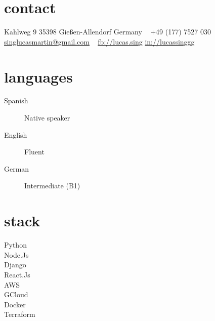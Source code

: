 \documentclass[a4paper,nocolors]{cv-friggeri-x}
\begin{document}


\begin{aside} %
\section{contact}
\pin \hfill Kahlweg 9
35398 Gießen-Allendorf
Germany
~
{\Large\textcolor{gray}{\Mobilefone}} \hfill +49 (177) 7527 030
\hfill \href{mailto:singlucasmartin@gmail.com}{\footnotesize singlucasmartin@gmail.com}
~
\flogo \hfill \href{http://facebook.com/lucas.sing}{fb://lucas.sing}
\llogo \hfill \href{https://www.linkedin.com/in/lucassinggg}{in://lucassinggg}
~
\section{languages}
\begin{description}
  \item[Spanish] \hfill Native speaker
  \item[English] \hfill Fluent
  \item[German] \hfill Intermediate (B1)
\end{description}
\section{stack}
\begin{description} 
  \item[Python] \hfill \filleddot \filleddot \filleddot \filleddot \emptydot
  \item[Node.Js] \hfill \filleddot \filleddot \filleddot \emptydot \emptydot
  \item[Django] \hfill \filleddot \filleddot \filleddot \filleddot \filleddot 
  \item[React.Js] \hfill \filleddot \filleddot \filleddot \emptydot \emptydot
  \item[AWS] \hfill \filleddot \filleddot \filleddot \emptydot \emptydot
  \item[GCloud] \hfill \filleddot \filleddot \filleddot \emptydot \emptydot
  \item[Docker] \hfill \filleddot \filleddot \filleddot \filleddot \emptydot
  \item[Terraform] \hfill \filleddot \emptydot \emptydot \emptydot \emptydot
\end{description}
\end{aside}
\end{document}
